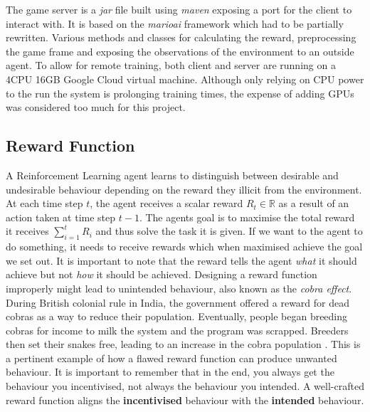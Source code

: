 \documentclass[notitlepage,a4paper,11pt]{article}
\newcommand{\R}{\mathbb{R}}
\begin{document}
The game server is a \textit{jar} file built using \textit{maven} exposing a port for the client to interact with. It is based on the \textit{marioai} \cite{marioai} framework which had to be partially rewritten. Various methods and classes for calculating the reward, preprocessing the game frame and exposing the observations of the environment to an outside agent. To allow for remote training, both client and server are running on a 4CPU 16GB Google Cloud virtual machine. Although only relying on CPU power to the run the system is prolonging training times, the expense of adding GPUs was considered too much for this project.


\subsection{Reward Function} \label{reward_function}

A Reinforcement Learning agent learns to distinguish between desirable and undesirable behaviour depending on the reward they illicit from the environment. At each time step $t$, the agent receives a scalar reward $R_t \in \R$ as a result of an action taken at time step $t-1$. The agents goal is to maximise the total reward it receives $\sum^{t}_{i=1} R_i$ and thus solve the task it is given. If we want to the agent to do something, it needs to receive rewards which when maximised achieve the goal we set out. It is important to note that the reward tells the agent \textit{what} it should achieve but not \textit{how} it should be achieved. Designing a reward function improperly might lead to unintended behaviour, also known as the \textit{cobra effect}. During British colonial rule in India, the government offered a reward for dead cobras as a way to reduce their population. Eventually, people began breeding cobras for income to milk the system and the program was scrapped. Breeders then set their snakes free, leading to an increase in the cobra population \cite{siebert2001kobra}. This is a pertinent example of how a flawed reward function can produce unwanted behaviour. It is important to remember that in the end, you always get the behaviour you incentivised, not always the behaviour you intended. A well-crafted reward function aligns the \textbf{incentivised} behaviour with the \textbf{intended} behaviour.
\end{document}
